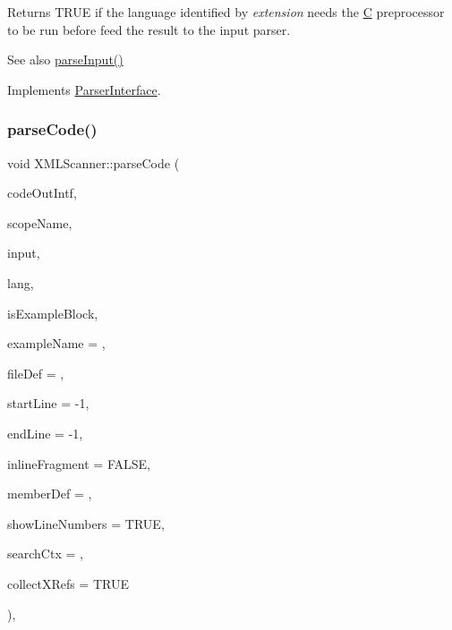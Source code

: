 Returns T\+R\+UE if the language identified by {\itshape extension} needs the \mbox{\hyperlink{class_c}{C}} preprocessor to be run before feed the result to the input parser. \begin{DoxySeeAlso}{See also}
\mbox{\hyperlink{class_x_m_l_scanner_ad7b6e344f24e73a8757937a806b5931a}{parse\+Input()}} 
\end{DoxySeeAlso}


Implements \mbox{\hyperlink{class_parser_interface_a36c669b17b64a6e3847f27d70a5398d2}{Parser\+Interface}}.

\mbox{\label{class_x_m_l_scanner_a63895d17bafedb76a06399c80eecd840}} 
\subsubsection{\texorpdfstring{parseCode()}{parseCode()}}
{\footnotesize\ttfamily void X\+M\+L\+Scanner\+::parse\+Code (\begin{DoxyParamCaption}\item[{\mbox{\hyperlink{class_code_output_interface}{Code\+Output\+Interface}} \&}]{code\+Out\+Intf,  }\item[{const char $\ast$}]{scope\+Name,  }\item[{const \mbox{\hyperlink{class_q_c_string}{Q\+C\+String}} \&}]{input,  }\item[{\mbox{\hyperlink{types_8h_a9974623ce72fc23df5d64426b9178bf2}{Src\+Lang\+Ext}}}]{lang,  }\item[{bool}]{is\+Example\+Block,  }\item[{const char $\ast$}]{example\+Name = {},  }\item[{\mbox{\hyperlink{class_file_def}{File\+Def}} $\ast$}]{file\+Def = {},  }\item[{int}]{start\+Line = {\ttfamily -\/1},  }\item[{int}]{end\+Line = {\ttfamily -\/1},  }\item[{bool}]{inline\+Fragment = {\ttfamily FALSE},  }\item[{\mbox{\hyperlink{class_member_def}{Member\+Def}} $\ast$}]{member\+Def = {},  }\item[{bool}]{show\+Line\+Numbers = {\ttfamily TRUE},  }\item[{\mbox{\hyperlink{class_definition}{Definition}} $\ast$}]{search\+Ctx = {},  }\item[{bool}]{collect\+X\+Refs = {\ttfamily TRUE} }\end{DoxyParamCaption})\hspace{0.3cm}{\ttfamily [inline]}, {\ttfamily [virtual]}}

